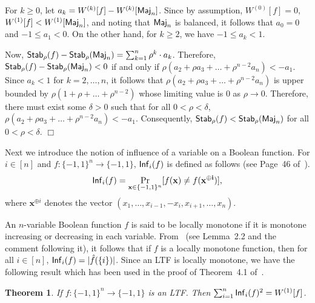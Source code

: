 \documentclass[11pt]{article}
\newtheorem{theorem}{Theorem}
\newenvironment{proof}{\noindent{\bf Proof:}\indent}%
                      {\hfill $\Box$\par}
\newcommand{\sym}[1]{{\sf #1}}
\begin{document}
\begin{proof}
	For $k\geq 0$, let $a_k={W}^{(k)}[f]-{W}^{(k)}[\sym{Maj}_n]$. Since by assumption, ${W}^{(0)}[f]=0$, 
	${W}^{(1)}[f]<{W}^{(1)}[\sym{Maj}_n]$, and noting that $\sym{Maj}_n$ is balanced, it follows that $a_0=0$ and $-1\leq a_1<0$. On the
	other hand, for $k\geq 2$, we have $-1\leq a_k<1$. 

	Now, $\sym{Stab}_{\rho}(f)-\sym{Stab}_{\rho}(\sym{Maj}_n)=\sum_{k=1}^{n}\rho^{k}\cdot a_k$.
	Therefore, $\sym{Stab}_{\rho}(f)-\sym{Stab}_{\rho}(\sym{Maj}_n)<0$ if and only if $\rho(a_2+\rho a_3+\ldots+\rho^{n-2}a_n)<-a_1$. Since $a_k<1$ for $k=2,\ldots,n$,
	it follows that 
	$\rho(a_2+\rho a_3+\ldots+\rho^{n-2}a_n)$ is upper bounded by $\rho(1+\rho+\ldots+\rho^{n-2})$ whose limiting value is $0$ as $\rho\to0$. Therefore, there must 
	exist some $\delta>0$ such that for all $0<\rho<\delta$, $\rho(a_2+\rho a_3+\ldots+\rho^{n-2}a_n)<-a_1$. Consequently, 
	$\sym{Stab}_{\rho}(f)<\sym{Stab}_{\rho}(\sym{Maj}_{n})$ for all $0<\rho<\delta$.
\end{proof}

Next we introduce the notion of influence of a variable on a Boolean function. For $i\in[n]$ and 
$f: \{-1,1\}^n \rightarrow \{-1,1\}$, $\sym{Inf}_i(f)$ is defined as follows (see Page~46 of~\cite{o2014analysis}).
\begin{equation*}
    \sym{Inf}_{i}(f) = \Pr_{\mathbf{x} \in \{-1,1\}^n}[f(\mathbf{x}) \neq f(\mathbf{x^{\oplus i}})],
\end{equation*}
where $\mathbf{x}^{\oplus i}$ denotes the vector $(x_1,\ldots , x_{i-1}, -x_i , x_{i+1}, \ldots , x_n)$.

An $n$-variable Boolean function $f$ is said to be locally monotone if it is monotone increasing or decreasing in each variable.
From~\cite{gotsman1994spectral} (see Lemma~2.2 and the comment following it), it follows that if $f$ is a locally monotone function, then for all $i\in [n]$, 
$\sym{Inf}_i(f)=|\hat{f}(\{i\})|$. Since an LTF is locally monotone, we have the following result which has been used in the proof of Theorem~4.1 of~\cite{gotsman1994spectral}.
\begin{theorem} \label{gotsman_linial_theorem}\cite{gotsman1994spectral}
If $f:\{-1,1\}^n\rightarrow\{-1,1\}$ is an LTF. Then $\sum_{i=1}^n\sym{Inf}_i(f)^2 = {W}^{(1)}[f]$.
\end{theorem}
\end{document}
